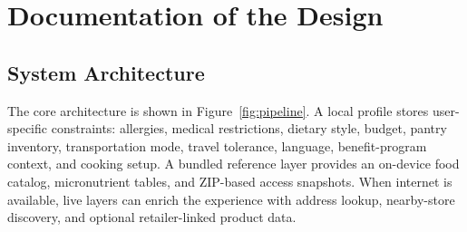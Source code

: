 \documentclass[11pt,letterpaper]{article}
\begin{document}
\section{Documentation of the Design}
\subsection{System Architecture}
The core architecture is shown in Figure~\ref{fig:pipeline}. A local profile stores user-specific constraints: allergies, medical restrictions, dietary style, budget, pantry inventory, transportation mode, travel tolerance, language, benefit-program context, and cooking setup. A bundled reference layer provides an on-device food catalog, micronutrient tables, and ZIP-based access snapshots. When internet is available, live layers can enrich the experience with address lookup, nearby-store discovery, and optional retailer-linked product data.
\end{document}
